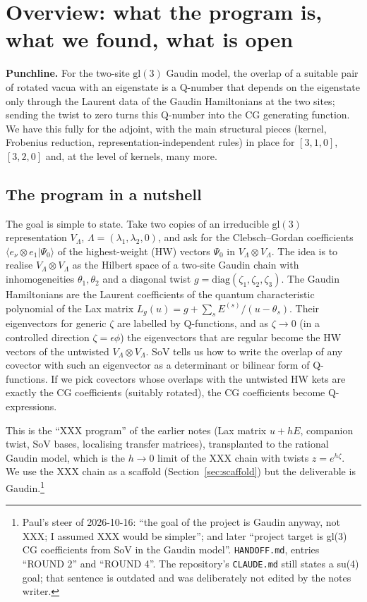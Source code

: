\documentclass[11pt]{article}
\begin{document}
\tableofcontents
\bigskip

\setcounter{section}{-1}

\section{Overview: what the program is, what we found, what is open}\label{sec:overview}

\textbf{Punchline.} For the two-site $\mathrm{gl}(3)$ Gaudin model, the overlap of a suitable pair of rotated vacua with an eigenstate is a Q-number that depends on the eigenstate only through the Laurent data of the Gaudin Hamiltonians at the two sites; sending the twist to zero turns this Q-number into the CG generating function.
We have this fully for the adjoint, with the main structural pieces (kernel, Frobenius reduction, representation-independent rules) in place for $[3,1,0]$, $[3,2,0]$ and, at the level of kernels, many more.

\subsection{The program in a nutshell}\label{sec:nutshell}

The goal is simple to state.
Take two copies of an irreducible $\mathrm{gl}(3)$ representation $V_\Lambda$, $\Lambda=(\lambda_1,\lambda_2,0)$, and ask for the Clebsch--Gordan coefficients $\langle e_\nu\otimes e_1|\Psi_0\rangle$ of the highest-weight (HW) vectors $\Psi_0$ in $V_\Lambda\otimes V_\Lambda$. The idea is to realise $V_\Lambda\otimes V_\Lambda$ as the Hilbert space of a two-site Gaudin chain with inhomogeneities $\theta_1,\theta_2$ and a diagonal twist $g=\mathrm{diag}(\zeta_1,\zeta_2,\zeta_3)$. The Gaudin Hamiltonians are the Laurent coefficients of the quantum characteristic polynomial of the Lax matrix $L_g(u)=g+\sum_sE^{(s)}/(u-\theta_s)$. Their eigenvectors for generic $\zeta$ are labelled by Q-functions, and as $\zeta\to0$ (in a controlled direction $\zeta=\epsilon\phi$) the eigenvectors that are regular become the HW vectors of the untwisted $V_\Lambda\otimes V_\Lambda$. SoV tells us how to write the overlap of any covector with such an eigenvector as a determinant or bilinear form of Q-functions.
If we pick covectors whose overlaps with the untwisted HW kets are exactly the CG coefficients (suitably rotated), the CG coefficients become Q-expressions.

This is the ``XXX program'' of the earlier notes (Lax matrix $u+hE$, companion twist, SoV bases, localising transfer matrices), transplanted to the rational Gaudin model, which is the $h\to0$ limit of the XXX chain with twists $z=e^{h\zeta}$. We use the XXX chain as a scaffold (Section~\ref{sec:scaffold}) but the deliverable is Gaudin.\footnote{Paul's steer of 2026-10-16: ``the goal of the project is Gaudin anyway, not XXX; I assumed XXX would be simpler''; and later ``project target is gl(3) CG coefficients from SoV in the Gaudin model''. \texttt{HANDOFF.\allowbreak{}md}, entries ``ROUND 2'' and ``ROUND 4''. The repository's \texttt{CLAUDE.\allowbreak{}md} still states a su(4) goal; that sentence is outdated and was deliberately not edited by the notes writer.}
\end{document}
